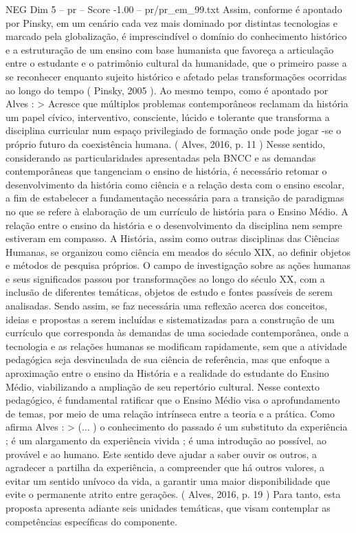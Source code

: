 \begin{textsample}{NEG Dim 5 – pr – Score -1.00 – pr/pr\_em\_99.txt}
Assim, conforme é apontado por Pinsky, em um cenário cada vez mais dominado por distintas tecnologias e marcado pela globalização, é imprescindível o domínio do conhecimento histórico e a estruturação de um ensino com base humanista que favoreça a articulação entre o estudante e o patrimônio cultural da humanidade, que o primeiro passe a se reconhecer enquanto sujeito histórico e afetado pelas transformações ocorridas ao longo do tempo ( Pinsky, 2005 ).
Ao mesmo tempo, como é apontado por Alves : > Acresce que múltiplos problemas contemporâneos reclamam da história um papel cívico, interventivo, consciente, lúcido e tolerante que transforma a disciplina curricular num espaço privilegiado de formação onde pode jogar -se o próprio futuro da coexistência humana. ( Alves, 2016, p. 11 ) Nesse sentido, considerando as particularidades apresentadas pela BNCC e as demandas contemporâneas que tangenciam o ensino de história, é necessário retomar o desenvolvimento da história como ciência e a relação desta com o ensino escolar, a fim de estabelecer a fundamentação necessária para a transição de paradigmas no que se refere à elaboração de um currículo de história para o Ensino Médio.
A relação entre o ensino da história e o desenvolvimento da disciplina nem sempre estiveram em compasso.
A História, assim como outras disciplinas das Ciências Humanas, se organizou como ciência em meados do século XIX, ao definir objetos e métodos de pesquisa próprios.
O campo de investigação sobre as ações humanas e seus significados passou por transformações ao longo do século XX, com a inclusão de diferentes temáticas, objetos de estudo e fontes passíveis de serem analisadas.
Sendo assim, se faz necessária uma reflexão acerca dos conceitos, ideias e propostas a serem incluídas e sistematizadas para a construção de um currículo que corresponda às demandas de uma sociedade contemporânea, onde a tecnologia e as relações humanas se modificam rapidamente, sem que a atividade pedagógica seja desvinculada de sua ciência de referência, mas que enfoque a aproximação entre o ensino da História e a realidade do estudante do Ensino Médio, viabilizando a ampliação de seu repertório cultural.
Nesse contexto pedagógico, é fundamental ratificar que o Ensino Médio visa o aprofundamento de temas, por meio de uma relação intrínseca entre a teoria e a prática.
Como afirma Alves : > (... ) o conhecimento do passado é um substituto da experiência ; é um alargamento da experiência vivida ; é uma introdução ao possível, ao provável e ao humano.
Este sentido deve ajudar a saber ouvir os outros, a agradecer a partilha da experiência, a compreender que há outros valores, a evitar um sentido unívoco da vida, a garantir uma maior disponibilidade que evite o permanente atrito entre gerações. ( Alves, 2016, p. 19 ) Para tanto, esta proposta apresenta adiante seis unidades temáticas, que visam contemplar as competências específicas do componente.

\end{textsample}
